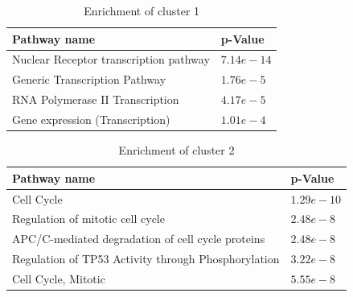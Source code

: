 \documentclass[bsc,frontabs,twoside,singlespacing,parskip,deptreport]{infthesis}     %
\begin{document}
\begin{table}[h!]

\centering
\begin{tabular}{ll} 
\toprule
Pathway name  & p-Value \\
\midrule
Nuclear Receptor transcription pathway & $7.14e-14$ \\
Generic Transcription Pathway &  $1.76e-5$ \\
RNA Polymerase II  Transcription &  $4.17e-5$ \\
Gene expression (Transcription) &  $1.01e-4$ \\
\bottomrule
\end{tabular}
\caption{Enrichment of cluster 1}\label{c1_enrichment}


\end{table}

\begin{table}[h!]
\centering
\begin{tabular}{ll} 
\toprule
Pathway name & p-Value \\

\midrule
Cell Cycle & $1.29e-10$ \\
Regulation of mitotic cell cycle & $2.48e-8$ \\
APC/C-mediated degradation of  cell cycle proteins & $2.48e-8$ \\
Regulation of TP53 Activity through Phosphorylation & $3.22e-8$ \\
Cell Cycle, Mitotic & $5.55e-8$ \\

\bottomrule
\end{tabular}
\caption{Enrichment of cluster 2}\label{c2_enrichment}
\end{table}
\end{document}
